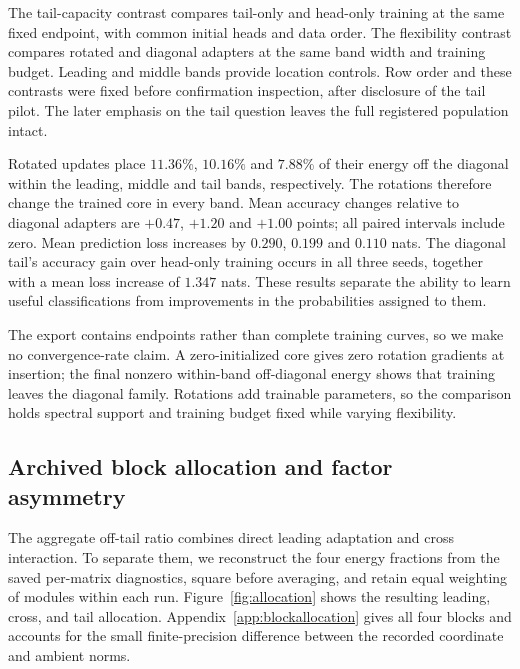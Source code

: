 \documentclass{article}
\begin{document}
The tail-capacity contrast compares tail-only and head-only training at the same fixed endpoint, with common initial heads and data order. The flexibility contrast compares rotated and diagonal adapters at the same band width and training budget. Leading and middle bands provide location controls. Row order and these contrasts were fixed before confirmation inspection, after disclosure of the tail pilot. The later emphasis on the tail question leaves the full registered population intact.

Rotated updates place $11.36\%$, $10.16\%$ and $7.88\%$ of their energy off the diagonal within the leading, middle and tail bands, respectively. The rotations therefore change the trained core in every band. Mean accuracy changes relative to diagonal adapters are $+0.47$, $+1.20$ and $+1.00$ points; all paired intervals include zero. Mean prediction loss increases by $0.290$, $0.199$ and $0.110$ nats. The diagonal tail's accuracy gain over head-only training occurs in all three seeds, together with a mean loss increase of $1.347$ nats. These results separate the ability to learn useful classifications from improvements in the probabilities assigned to them.

The export contains endpoints rather than complete training curves, so we make no convergence-rate claim. A zero-initialized core gives zero rotation gradients at insertion; the final nonzero within-band off-diagonal energy shows that training leaves the diagonal family. Rotations add trainable parameters, so the comparison holds spectral support and training budget fixed while varying flexibility.

\subsection{Archived block allocation and factor asymmetry}
\label{app:legacyplacement}
The aggregate off-tail ratio combines direct leading adaptation and cross interaction. To separate them, we reconstruct the four energy fractions from the saved per-matrix diagnostics, square before averaging, and retain equal weighting of modules within each run. Figure~\ref{fig:allocation} shows the resulting leading, cross, and tail allocation. Appendix~\ref{app:blockallocation} gives all four blocks and accounts for the small finite-precision difference between the recorded coordinate and ambient norms.
\end{document}
